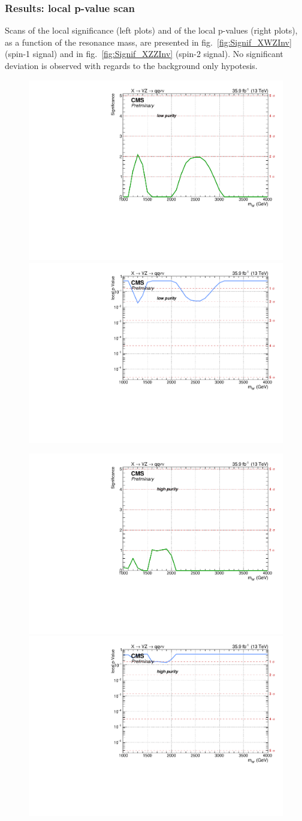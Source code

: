 \subsubsection{Results: local p-value scan}
Scans of the local significance (left plots) and of the local p-values (right plots), as a function of the resonance mass, are presented in fig.~\ref{fig:Signif_XWZInv} (spin-1 signal) and in fig.~\ref{fig:Signif_XZZInv} (spin-2 signal). No significant deviation is observed with regards to the background only hypotesis.


\begin{figure}[!htb]
  \begin{center}
     \includegraphics[width=.495\textwidth]{v9/plotsAlpha/Limits/Significance_XWZInv_XVZnnlp.pdf}%
     \includegraphics[width=.495\textwidth]{v9/plotsAlpha/Limits/pValue_XWZInv_XVZnnlp.pdf}

     \includegraphics[width=.495\textwidth]{v9/plotsAlpha/Limits/Significance_XWZInv_XVZnnhp.pdf}%
     \includegraphics[width=.495\textwidth]{v9/plotsAlpha/Limits/pValue_XWZInv_XVZnnhp.pdf}


\end{center}
\end{figure}
